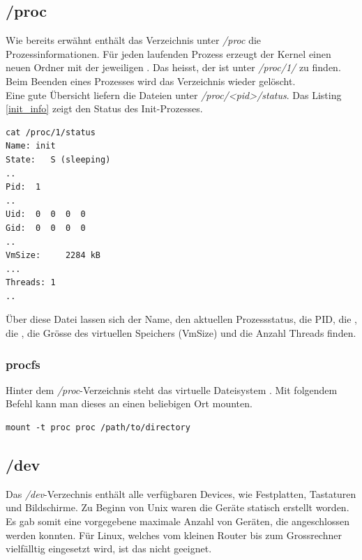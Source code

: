 \subsection{/proc}

Wie bereits erwähnt enthält das Verzeichnis unter \emph{/proc} die Prozessinformationen. 
Für jeden laufenden Prozess erzeugt der Kernel einen neuen Ordner mit der jeweiligen
. Das heisst, der  ist unter \emph{/proc/1/} 
zu finden. Beim Beenden eines Prozesses wird das Verzeichnis wieder gelöscht. \\

Eine gute Übersicht liefern die Dateien unter \emph{/proc/<pid>/status}. Das Listing \ref{init_info}
zeigt den Status des Init-Prozesses. 

\begin{lstlisting}[label=init_info,caption=/proc/1/status]
cat /proc/1/status
Name: init
State:   S (sleeping)
..
Pid:  1
..
Uid:  0  0  0  0
Gid:  0  0  0  0
..
VmSize:     2284 kB
...
Threads: 1
..
\end{lstlisting}

Über diese Datei lassen sich der Name, den aktuellen Prozessstatus, die PID, die , die ,
die Grösse des virtuellen Speichers (VmSize) und die Anzahl Threads finden. 

\subsubsection{procfs}

Hinter dem \emph{/proc}-Verzeichnis steht das virtuelle Dateisystem . Mit folgendem Befehl kann man dieses an einen beliebigen Ort mounten.
\begin{lstlisting}
mount -t proc proc /path/to/directory
\end{lstlisting}


\subsection{/dev}

Das \emph{/dev}-Verzechnis enthält alle verfügbaren Devices, wie Festplatten, Tastaturen und Bildschirme. Zu Beginn von Unix waren die Geräte statisch erstellt
worden. Es gab somit eine vorgegebene maximale Anzahl von Geräten, die angeschlossen werden konnten. Für Linux, welches vom kleinen Router bis zum Grossrechner
vielfälltig eingesetzt wird, ist das nicht geeignet. \\

